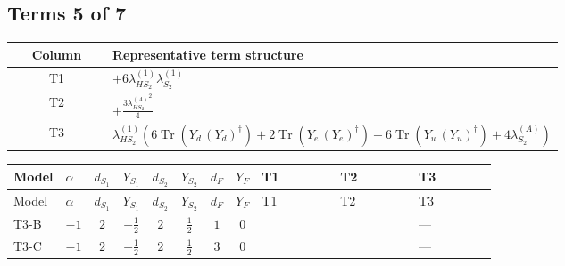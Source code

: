 \documentclass[8pt]{article}
\begin{document}
\begin{landscape}
\subsection*{Terms 5 of 7}
\begin{center}
\begin{tabular}{@{}c >{\raggedright\arraybackslash}p{0.82\linewidth}@{}}
\toprule
Column & Representative term structure \\
\midrule
T1 & \(\displaystyle +6 {\lambda_{HS_2}^{(1)}} {\lambda_{S_2}^{(1)}}\) \\
\midrule
T2 & \(\displaystyle +\frac{3 {\lambda_{HS_2}^{(A)}}^2}{4}\) \\
\midrule
T3 & \(\displaystyle {\lambda_{HS_2}^{(1)}} (6 \operatorname{Tr}\!\left({Y_d}\,\left({Y_d}\right)^{\dagger}\right)+2 \operatorname{Tr}\!\left({Y_e}\,\left({Y_e}\right)^{\dagger}\right)+6 \operatorname{Tr}\!\left({Y_u}\,\left({Y_u}\right)^{\dagger}\right)+4 {\lambda_{S_2}^{(A)}})\) \\
\midrule
\bottomrule
\end{tabular}
\end{center}
\smallskip
\tiny
\begin{longtable}{@{}llcccccc >{\raggedright\arraybackslash}p{0.21\linewidth} >{\raggedright\arraybackslash}p{0.21\linewidth} >{\raggedright\arraybackslash}p{0.21\linewidth}@{}}
\toprule
Model & $\alpha$ & $d_{S_1}$ & $Y_{S_1}$ & $d_{S_2}$ & $Y_{S_2}$ & $d_F$ & $Y_F$ & T1 & T2 & T3 \\
\midrule
\endfirsthead
\toprule
Model & $\alpha$ & $d_{S_1}$ & $Y_{S_1}$ & $d_{S_2}$ & $Y_{S_2}$ & $d_F$ & $Y_F$ & T1 & T2 & T3 \\
\midrule
\endhead
T3-B & $-1$ & $2$ & $-\frac{1}{2}$ & $2$ & $\frac{1}{2}$ & $1$ & $0$ & \scriptsize\adjustbox{max width=\linewidth}{$\begin{gathered} +6 {\lambda_{HS_2}^{(1)}} {\lambda_{S_2}^{(1)}}\end{gathered}$} & \scriptsize\adjustbox{max width=\linewidth}{$\begin{gathered} +\frac{3 {\lambda_{HS_2}^{(A)}}^2}{4}\end{gathered}$} & --- \\
\midrule
T3-C & $-1$ & $2$ & $-\frac{1}{2}$ & $2$ & $\frac{1}{2}$ & $3$ & $0$ & \scriptsize\adjustbox{max width=\linewidth}{$\begin{gathered} +6 {\lambda_{HS_2}^{(1)}} {\lambda_{S_2}^{(1)}}\end{gathered}$} & \scriptsize\adjustbox{max width=\linewidth}{$\begin{gathered} +\frac{3 {\lambda_{HS_2}^{(A)}}^2}{4}\end{gathered}$} & --- \\

\end{longtable}
\end{landscape}
\end{document}

